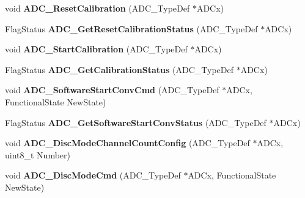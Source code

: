 \begin{DoxyCompactItemize}
\item 
\hypertarget{group__ADC__Exported__Functions_ga3d542020ba28c1d16238a0defbee6d8f}{
void {\bfseries ADC\_\-ResetCalibration} (ADC\_\-TypeDef $\ast$ADCx)}
\label{group__ADC__Exported__Functions_ga3d542020ba28c1d16238a0defbee6d8f}

\item 
\hypertarget{group__ADC__Exported__Functions_ga113be9fe25add8d7496bed659c68e02b}{
FlagStatus {\bfseries ADC\_\-GetResetCalibrationStatus} (ADC\_\-TypeDef $\ast$ADCx)}
\label{group__ADC__Exported__Functions_ga113be9fe25add8d7496bed659c68e02b}

\item 
\hypertarget{group__ADC__Exported__Functions_gadcba6341124a6aabfd2dd885ca8e5f14}{
void {\bfseries ADC\_\-StartCalibration} (ADC\_\-TypeDef $\ast$ADCx)}
\label{group__ADC__Exported__Functions_gadcba6341124a6aabfd2dd885ca8e5f14}

\item 
\hypertarget{group__ADC__Exported__Functions_ga7a728f699b487c7fa1694d7424967122}{
FlagStatus {\bfseries ADC\_\-GetCalibrationStatus} (ADC\_\-TypeDef $\ast$ADCx)}
\label{group__ADC__Exported__Functions_ga7a728f699b487c7fa1694d7424967122}

\item 
\hypertarget{group__ADC__Exported__Functions_ga694130a8d1ad3c8877b7eddb29611b30}{
void {\bfseries ADC\_\-SoftwareStartConvCmd} (ADC\_\-TypeDef $\ast$ADCx, FunctionalState NewState)}
\label{group__ADC__Exported__Functions_ga694130a8d1ad3c8877b7eddb29611b30}

\item 
\hypertarget{group__ADC__Exported__Functions_gaf1119583782ecbcec380efcb7eb74883}{
FlagStatus {\bfseries ADC\_\-GetSoftwareStartConvStatus} (ADC\_\-TypeDef $\ast$ADCx)}
\label{group__ADC__Exported__Functions_gaf1119583782ecbcec380efcb7eb74883}

\item 
\hypertarget{group__ADC__Exported__Functions_ga6eb241ba82d67d1371136c9132083937}{
void {\bfseries ADC\_\-DiscModeChannelCountConfig} (ADC\_\-TypeDef $\ast$ADCx, uint8\_\-t Number)}
\label{group__ADC__Exported__Functions_ga6eb241ba82d67d1371136c9132083937}

\item 
\hypertarget{group__ADC__Exported__Functions_ga1909649d10253ce88d986ffbb94a4be6}{
void {\bfseries ADC\_\-DiscModeCmd} (ADC\_\-TypeDef $\ast$ADCx, FunctionalState NewState)}
\label{group__ADC__Exported__Functions_ga1909649d10253ce88d986ffbb94a4be6}


\end{DoxyCompactItemize}
